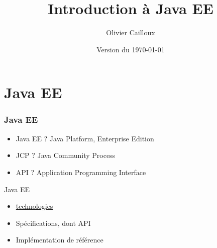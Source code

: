 \documentclass[english, french]{beamer}
\title{Introduction à Java EE}
\author{Olivier Cailloux}
\institute[LAMSADE]{LAMSADE, Université Paris-Dauphine}
\date{Version du \today}
\begin{document}


\begin{frame}[plain]
   \titlepage
\end{frame}
\addtocounter{framenumber}{-1}

\section{Java EE}
\begin{frame}
	\frametitle{Java EE}
	\begin{itemize}
		\item Java EE ? \pause Java Platform, Enterprise Edition \pause
		\item JCP ? \pause Java Community Process \pause
		\item API ? \pause Application Programming Interface \pause
	\end{itemize}
	\begin{block}{Java EE}
		\begin{itemize}
			\item \href{https://www.oracle.com/technetwork/java/javaee/tech/index.html}{technologies}
			\item Spécifications, dont API
			\item Implémentation de référence
		\end{itemize}
	\end{block}
\end{frame}
\end{document}
